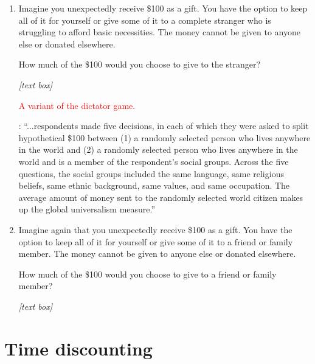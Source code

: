 \documentclass[11pt, headsepline]{article}
\newcommand{\red}[1]{\textcolor{red}{#1}}
\newcommand{\green}[1]{\textcolor{sharpgreen}{#1}}
\begin{document}
\begin{enumerate}[resume]

    \item Imagine you unexpectedly receive \$100 as a gift. You have the option to keep all of it for yourself or give some of it to a complete stranger who is struggling to afford basic necessities. The money cannot be given to anyone else or donated elsewhere.

    How much of the \$100 would you choose to give to the stranger?

    \textit{[text box]}

    \red{A variant of the dictator game.}
    
    \green{\cite{enke2023moral}: ``...respondents made five decisions, in each of which they were asked to split hypothetical \$100 between (1) a randomly selected person who lives anywhere in the world and (2) a randomly selected person who lives anywhere in the world and is a member of the respondent’s social groups. Across the five questions, the social groups included the same language, same religious beliefs, same ethnic background, same values, and same occupation. The average amount of money sent to the randomly selected world citizen makes up the global universalism measure.''}

    \item Imagine again that you unexpectedly receive \$100 as a gift. You have the option to keep all of it for yourself or give some of it to a friend or family member. The money cannot be given to anyone else or donated elsewhere.

    How much of the \$100 would you choose to give to a friend or family member?

    \textit{[text box]}
    
\end{enumerate}

\section*{Time discounting}
\end{document}
